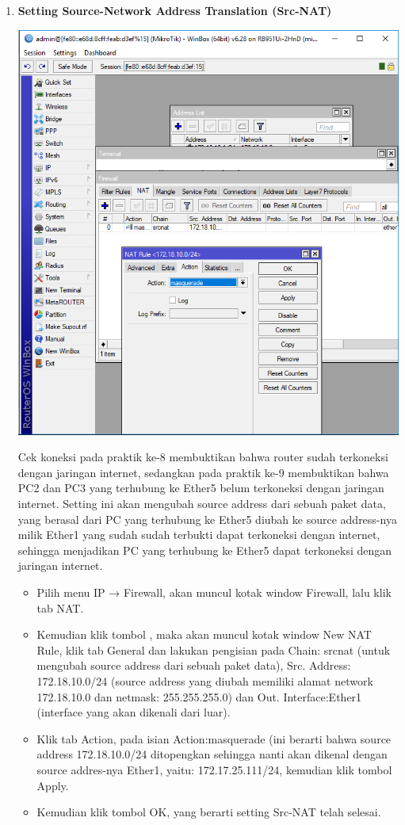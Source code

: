 \documentclass[a4paper,12pt]{article}
\begin{document}
\begin{enumerate}[label=\textbf{\arabic*.}]
    \item \textbf{Setting Source-Network Address Translation (Src-NAT)}
        \begin{center}
            \includegraphics[width=0.8\linewidth]{image12.png}
        \end{center}
        Cek koneksi pada praktik ke-8 membuktikan bahwa router sudah terkoneksi dengan jaringan internet, sedangkan pada praktik ke-9 membuktikan bahwa PC2 dan PC3 yang terhubung ke Ether5 belum terkoneksi dengan jaringan internet. Setting ini akan mengubah source address dari sebuah paket data, yang berasal dari PC yang terhubung ke Ether5 diubah ke source address-nya milik Ether1 yang sudah sudah terbukti dapat terkoneksi dengan internet, sehingga menjadikan PC yang terhubung ke Ether5 dapat terkoneksi dengan jaringan internet.
        \begin{itemize}
            \item Pilih menu IP → Firewall, akan muncul kotak window Firewall, lalu klik tab NAT.
            \item Kemudian klik tombol  , maka akan muncul kotak window New NAT Rule, klik tab General dan lakukan pengisian pada Chain: srcnat (untuk mengubah source address dari sebuah paket data), Src. Address: 172.18.10.0/24 (source address yang diubah memiliki alamat network 172.18.10.0 dan netmask: 255.255.255.0) dan Out. Interface:Ether1 (interface yang akan dikenali dari luar).
            \item Klik tab Action, pada isian Action:masquerade (ini berarti bahwa source address 172.18.10.0/24 ditopengkan sehingga nanti akan dikenal dengan source addres-nya Ether1, yaitu: 172.17.25.111/24, kemudian klik tombol Apply.
            \item Kemudian klik tombol OK, yang berarti setting Src-NAT telah selesai.
        \end{itemize}


\end{enumerate}
\end{document}
